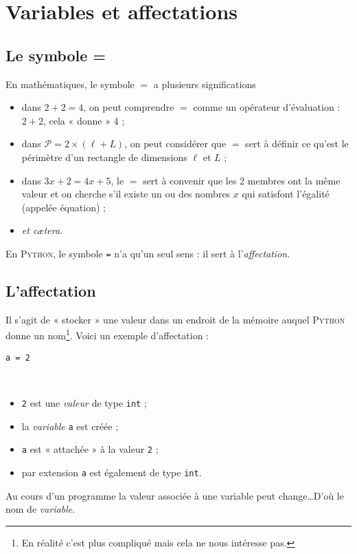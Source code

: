 \chapter{Variables et affectations}

\section{Le symbole =}

En mathématiques, le symbole $=$ a plusieurs significations
\begin{itemize}
	\item dans $2+2=4$, on peut comprendre $=$ comme un opérateur d'évaluation : $2+2$, cela « donne » $4$ ;
	\item dans $\mathcal{P}=2\times(\ell+L)$, on peut considérer que $=$ sert à définir ce qu'est le périmètre d'un rectangle de dimensions $\ell$ et $L$ ; 
	\item dans $3x + 2 = 4x +5$, le $=$ sert à convenir que les 2 membres ont la même valeur et on cherche s'il existe un ou des nombres $x$ qui satisfont l'égalité (appelée équation) ;
	\item \textit{et cætera}. 
\end{itemize}

En \textsc{Python}, le symbole \texttt{=}  n'a qu'un seul sens : il sert à l'\textit{affectation}.

\section{L'affectation}
Il s'agit de « stocker » une valeur dans un endroit de la mémoire auquel \textsc{Python} donne un nom\footnote{En réalité c'est plus compliqué mais cela ne nous intéresse pas.}. Voici un exemple d'affectation : 
\begin{center}\Large
\texttt{a = 2}
\end{center}\
\begin{itemize}
	\item   \texttt{2} est une \textit{valeur} de type \texttt{int} ;
	\item   la \textit{variable} \texttt{a} est créée ;\
	\item   \texttt{a} est « attachée » à la valeur \texttt{2} ;
	\item   par extension \texttt{a} est également de type \texttt{int}.
\end{itemize}
Au cours d'un programme la valeur associée à une variable peut change\ldots D'où le nom de \textit{variable}.\\


